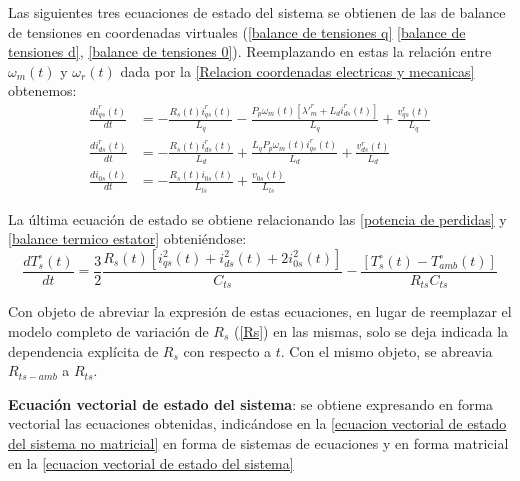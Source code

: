 \documentclass[a4paper, 10pt, onecolumn,journal]{ieeeconf}
\begin{document}
Las siguientes tres ecuaciones de estado del sistema se obtienen de las de balance de tensiones
en coordenadas virtuales (\cref{balance de tensiones q} \cref{balance de tensiones d}, \cref{balance de tensiones 0}).
Reemplazando en estas la relación entre $\omega_m(t)$ y $\omega_r(t)$ dada por la \cref{Relacion coordenadas electricas y mecanicas} obtenemos:
\begin{align}
    \frac{d i^r_{qs}(t)}{dt} &= -\frac{R_s(t) i^r_{qs}(t)}{L_q} - \frac{P_p \omega_m(t) \left[\lambda'^r_m + L_d i^r_{ds}(t)\right]}{L_q} + \frac{v^r_{qs}(t)}{L_q} \label{ecuacion de estado iqs}\\
    \frac{d i^r_{ds}(t)}{dt} &= -\frac{R_s(t) i^r_{ds}(t)}{L_d} + \frac{L_q P_p \omega_m(t)i^r_{qs}(t)}{L_d}  + \frac{v^r_{ds}(t)}{L_d} \label{ecuacion de estado ids}\\ 
    \frac{d i_{0s}(t)}{dt}   &= -\frac{R_s(t) i_{0s}(t)}{L_{ls}} + \frac{v_{0s}(t)}{L_{ls}}\label{ecuacion de estado i0s}
\end{align}

La última ecuación de estado se obtiene relacionando las \cref{potencia de perdidas} y \cref{balance termico estator} obteniéndose:
\begin{equation}
    \frac{d T^\circ_s(t)}{dt} = \frac{3}{2} \frac{R_s(t) \left[ i_{qs}^2(t) + i_{ds}^2(t) + 2 i_{0s}^2(t) \right]}{C_{ts}} - \frac{\left[T_s^{\circ}(t) - T_{amb}^{\circ}(t)\right]}{R_{ts}C_{ts}} 
    \label{ecuacion de estado Ts}
\end{equation}

Con objeto de abreviar la expresión de estas ecuaciones, en lugar de reemplazar el modelo completo de variación de $R_s$ (\cref{Rs}) en las mismas, 
solo se deja indicada la dependencia explícita de $R_s$ con respecto a $t$. Con el mismo objeto, se abreavia $R_{ts-amb}$ a $R_{ts}$.

\textbf{Ecuación vectorial de estado del sistema}: se obtiene expresando en forma vectorial las ecuaciones obtenidas, indicándose en la \cref{ecuacion vectorial de estado del sistema no matricial}
en forma de sistemas de ecuaciones y en forma matricial en la \cref{ecuacion vectorial de estado del sistema}
\end{document}
